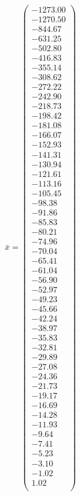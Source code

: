 \documentclass[a4paper,12pt]{article}
\begin{document}
$\bar { x } = \begin{pmatrix}
-1273.00 \\
-1270.50 \\
-844.67 \\
-631.25 \\
-502.80 \\
-416.83 \\
-355.14 \\
-308.62 \\
-272.22 \\
-242.90 \\
-218.73 \\
-198.42 \\
-181.08 \\
-166.07 \\
-152.93 \\
-141.31 \\
-130.94 \\
-121.61 \\
-113.16 \\
-105.45 \\
-98.38 \\
-91.86 \\
-85.83 \\
-80.21 \\
-74.96 \\
-70.04 \\
-65.41 \\
-61.04 \\
-56.90 \\
-52.97 \\
-49.23 \\
-45.66 \\
-42.24 \\
-38.97 \\
-35.83 \\
-32.81 \\
-29.89 \\
-27.08 \\
-24.36 \\
-21.73 \\
-19.17 \\
-16.69 \\
-14.28 \\
-11.93 \\
-9.64 \\
-7.41 \\
-5.23 \\
-3.10 \\
-1.02 \\
1.02 \\
\end{pmatrix}
$
\end{document}
